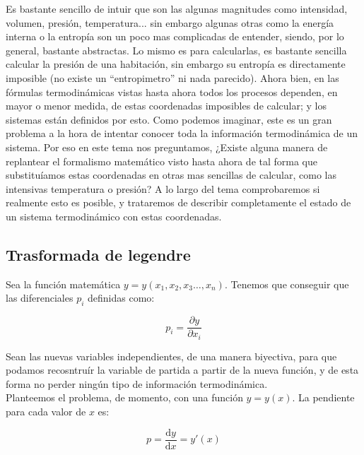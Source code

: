\documentclass[12pt,a4paper]{article}
\newcommand{\D}{\mathrm{d}}
\newcommand{\parciales}[2]{\frac{\partial #1}{\partial #2}}
\begin{document}
Es bastante sencillo de intuir que son las algunas magnitudes como intensidad, volumen, presión, temperatura... sin embargo algunas otras como la energía interna o la entropía son un poco mas complicadas de entender, siendo, por lo general, bastante abstractas. Lo mismo es para calcularlas, es bastante sencilla calcular la presión de una habitación, sin embargo su entropía es directamente imposible (no existe un ``entropimetro'' ni nada parecido). Ahora bien, en las fórmulas termodinámicas vistas hasta ahora todos los procesos dependen, en mayor o menor medida, de estas coordenadas imposibles de calcular; y los sistemas están definidos por esto. Como podemos imaginar, este es un gran problema a la hora de intentar conocer toda la información termodinámica de un sistema. Por eso en este tema nos preguntamos, ¿Existe alguna manera de replantear el formalismo matemático visto hasta ahora de tal forma que substituíamos estas coordenadas en otras mas sencillas de calcular, como las intensivas temperatura o presión? A lo largo del tema comprobaremos si realmente esto es posible, y trataremos de describir completamente el estado de un sistema termodinámico con estas coordenadas. \\

\subsection{Trasformada de legendre}

Sea la función matemática $y = y(x_1,x_2,x_3 \ldots, x_n)$. Tenemos que conseguir que las diferenciales $p_i$ definidas como:

\begin{equation}
p_i = \parciales{y}{x_i}
\end{equation}

Sean las nuevas variables independientes, de una manera biyectiva, para que podamos recosntruír la variable de partida a partir de la nueva función, y de esta forma no perder ningún tipo de información termodinámica. \\

Planteemos el problema, de momento, con una función $y=y(x)$. La pendiente para cada valor de $x$ es:

\begin{equation}
p = \dfrac{\D y}{\D x } = y' (x)
\end{equation} 
\end{document}
